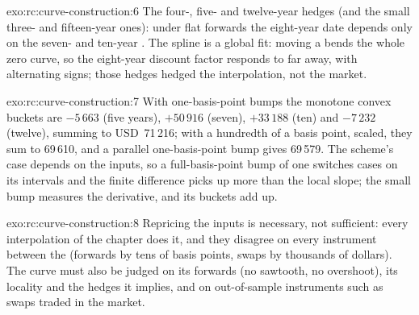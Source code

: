 \begin{solution}{exo:rc:curve-construction:6}
The four-, five- and twelve-year hedges (and the small three- and fifteen-year
ones): under flat forwards the eight-year date depends only on the seven- and
ten-year . The spline is a global fit: moving a  bends the whole
zero curve, so the eight-year discount factor responds to  far away,
with alternating signs; those hedges hedged the interpolation, not the market.
\end{solution}

\begin{solution}{exo:rc:curve-construction:7}
With one-basis-point bumps the monotone convex buckets are $-5\,663$ (five
years), $+50\,916$ (seven), $+33\,188$ (ten) and $-7\,232$ (twelve), summing to
USD~71\,216; with a hundredth of a basis point, scaled, they sum to 69\,610,
and a parallel one-basis-point bump gives 69\,579. The scheme's case depends on
the inputs, so a full-basis-point bump of one  switches cases on its
intervals and the finite difference picks up more than the local slope; the
small bump measures the derivative, and its buckets add up.
\end{solution}

\begin{solution}{exo:rc:curve-construction:8}
Repricing the inputs is necessary, not sufficient: every interpolation of the
chapter does it, and they disagree on every instrument between the 
(forwards by tens of basis points,  swaps by thousands of dollars).
The curve must also be judged on its forwards (no sawtooth, no overshoot), its
locality and the hedges it implies, and on out-of-sample instruments such as
 swaps traded in the market.
\end{solution}

